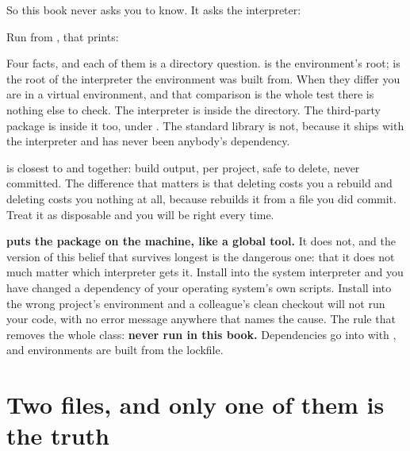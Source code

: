 So this book never asks you to know. It asks the interpreter:


\noindent
Run from , that prints:


\noindent
Four facts, and each of them is a directory question.  is the
environment's root;  is the root of the interpreter the
environment was built from. When they differ you are in a virtual environment,
and that comparison is the whole test \dash{} there is nothing else to check.
The interpreter is inside the directory. The third-party package is inside it
too, under . The standard library is not, because it ships
with the interpreter and has never been anybody's dependency.

\begin{csbox}
 is closest to  and  together: build output,
per project, safe to delete, never committed. The difference that matters is
that deleting  costs you a rebuild and deleting  costs
you nothing at all, because  rebuilds it from a file you did
commit. Treat it as disposable and you will be right every time.
\end{csbox}

\begin{trapbox}
\textbf{ puts the package on the machine, like a global
tool.} It does not, and the version of this belief that survives longest is
the dangerous one: that it does not much matter which interpreter gets it.
Install into the system interpreter and you have changed a dependency of your
operating system's own scripts. Install into the wrong project's environment
and a colleague's clean checkout will not run your code, with no error message
anywhere that names the cause. The rule that removes the whole class:
\textbf{never run  in this book.} Dependencies go into
 with , and environments are built from the
lockfile.
\end{trapbox}


\section{Two files, and only one of them is the truth}
\label{sec:ch02-two-files}

